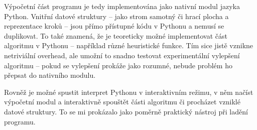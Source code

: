 \documentclass{article}
\begin{document}
Výpočetní část programu je tedy implementována jako nativní modul jazyka Python. Vnitřní datové struktury -- jako strom
samotný či hrací plocha a reprezentace kroků -- jsou přímo přístupné kódu v Pythonu a nemusí se duplikovat. To také
znamená, že je teoreticky možné implementovat část algoritmu v Pythonu -- například různé heuristické funkce. Tím sice
jistě vznikne netriviální overhead, ale umožní to snadno testovat experimentální vylepšení algoritmu -- pokud se
vylepšení prokáže jako rozumné, nebude problém ho přepsat do nativního modulu.

Rovněž je možné spustit interpret Pythonu v interaktivním režimu, v něm načíst výpočetní modul a interaktivně spouštět
části algoritmu či procházet vzniklé datové struktury. To se mi prokázalo jako poměrně praktický nástroj při ladění
programu.
\end{document}
